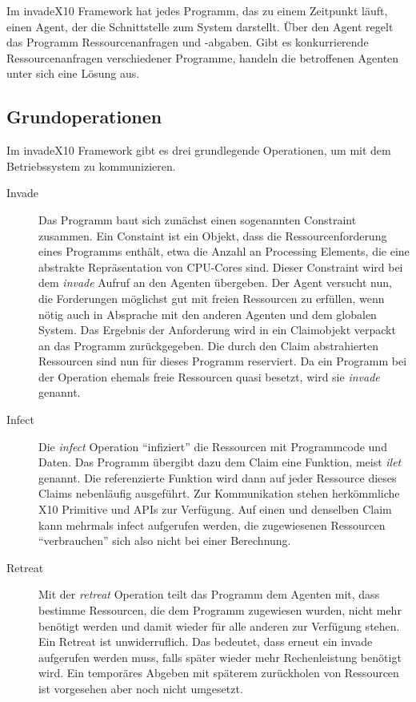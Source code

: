 Im invadeX10 Framework hat jedes Programm, das zu einem Zeitpunkt läuft, einen Agent, der die Schnittstelle zum System darstellt. Über den Agent regelt das Programm Ressourcenanfragen und -abgaben. Gibt es konkurrierende Ressourcenanfragen verschiedener Programme, handeln die betroffenen Agenten unter sich eine Lösung aus.
\subsection{Grundoperationen} %
\label{sub:grundoperationen}

Im invadeX10 Framework gibt es drei grundlegende Operationen, um mit dem Betriebssystem zu kommunizieren.
\begin{description}
	\item[Invade] Das Programm baut sich zunächst einen sogenannten Constraint zusammen. Ein Constaint ist ein Objekt, dass die Ressourcenforderung eines Programms enthält, etwa die Anzahl an Processing Elements, die eine abstrakte Repräsentation von CPU-Cores sind. Dieser Constraint wird bei dem \textit{invade} Aufruf an den Agenten übergeben. Der Agent versucht nun, die Forderungen möglichst gut mit freien Ressourcen zu erfüllen, wenn nötig auch in Absprache mit den anderen Agenten und dem globalen System. Das Ergebnis der Anforderung wird in ein Claimobjekt verpackt an das Programm zurückgegeben. Die durch den Claim abstrahierten Ressourcen sind nun für dieses Programm reserviert. Da ein Programm bei der Operation ehemals freie Ressourcen quasi besetzt, wird sie \textit{invade} genannt.
	\item[Infect] Die \textit{infect} Operation \enquote{infiziert} die Ressourcen mit Programmcode und Daten. Das Programm übergibt dazu dem Claim eine Funktion, meist \textit{ilet} genannt. Die referenzierte Funktion wird dann auf jeder Ressource dieses Claims nebenläufig ausgeführt. Zur Kommunikation stehen herkömmliche X10 Primitive und APIs zur Verfügung. Auf einen und denselben Claim kann mehrmals infect aufgerufen werden, die zugewiesenen Ressourcen \enquote{verbrauchen} sich also nicht bei einer Berechnung.
	\item[Retreat] Mit der \textit{retreat} Operation teilt das Programm dem Agenten mit, dass bestimme Ressourcen, die dem Programm zugewiesen wurden, nicht mehr benötigt werden und damit wieder für alle anderen zur Verfügung stehen. Ein Retreat ist unwiderruflich. Das bedeutet, dass erneut ein invade aufgerufen werden muss, falls später wieder mehr Rechenleistung benötigt wird. Ein temporäres Abgeben mit späterem zurückholen von Ressourcen ist vorgesehen aber noch nicht umgesetzt.
\end{description}

